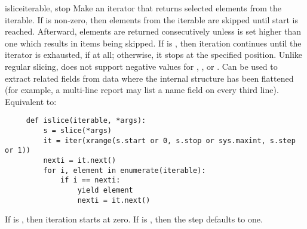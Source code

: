 \begin{funcdesc}{islice}{iterable,  stop }
  Make an iterator that returns selected elements from the iterable.
  If  is non-zero, then elements from the iterable are skipped
  until start is reached.  Afterward, elements are returned consecutively
  unless  is set higher than one which results in items being
  skipped.  If  is , then iteration continues until
  the iterator is exhausted, if at all; otherwise, it stops at the specified
  position.  Unlike regular slicing,
   does not support negative values for ,
  , or .  Can be used to extract related fields
  from data where the internal structure has been flattened (for
  example, a multi-line report may list a name field on every
  third line).  Equivalent to:

  \begin{verbatim}
     def islice(iterable, *args):
         s = slice(*args)
         it = iter(xrange(s.start or 0, s.stop or sys.maxint, s.step or 1))
         nexti = it.next()
         for i, element in enumerate(iterable):
             if i == nexti:
                 yield element
                 nexti = it.next()          
  \end{verbatim}

  If  is , then iteration starts at zero.
  If  is , then the step defaults to one.
\end{funcdesc}

